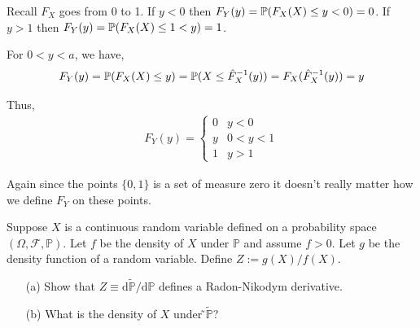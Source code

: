 \documentclass[10pt]{article}
\begin{document}
\begin{solution}[Solution]
\begin{enumerate}
Recall \( F_X \) goes from 0 to 1. If \( y<0 \) then \( F_Y(y) = \mathbb{P}(F_X(X)\leq y < 0) = 0 \). If \( y>1 \) then \( F_Y(y) = \mathbb{P}(F_X(X)\leq 1<y) = 1 \).

For \( 0<y<a \), we have, 
\begin{align*}
    F_Y(y) = \mathbb{P}(F_X(X)\leq y) = \mathbb{P}(X\leq \hat{F}_X^{-1}(y)) = F_X(\hat{F}_X^{-1}(y)) = y
\end{align*}

Thus,
\begin{align*}
    F_Y(y) = 
    \begin{cases}
        0 & y < 0\\ 
        y & 0<y<1 \\
        1 & y>1
    \end{cases}
\end{align*}

Again since the points \( \{0,1\} \) is a set of measure zero it doesn't really matter how we define \( F_Y \) on these points.

\end{enumerate}
\end{solution}

\begin{problem}[Exercise 1.6]
Suppose \( X \) is a continuous random variable defined on a probability space \( (\Omega,\mathcal{F},\mathbb{P}) \). Let \( f \) be the density of \( X \) under \( \mathbb{P} \) and assume \( f>0 \). Let \( g \) be the density function of a random variable. Define \( Z:=g(X)/f(X) \).
\begin{enumerate}
    \item[(a)] Show that \( Z\equiv \text{d}\tilde{\mathbb{P}}/\text{d}\mathbb{P} \) defines a Radon-Nikodym derivative.
	\item[(b)] What is the density of \( X \) under ̃\( \tilde{\mathbb{P}} \)?
\end{enumerate}
\end{problem}
\end{document}

